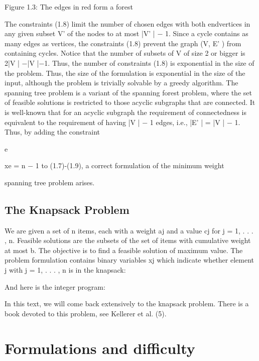 \documentclass[titlepage]{book}
\begin{document}

Figure 1.3: The edges in red form a forest


The constraints (1.8) limit the number of chosen edges with both endvertices in any given subset V' of
the nodes to at most |V' | − 1. Since a cycle contains as many edges as vertices, the constraints (1.8)
prevent the graph (V, E' ) from containing cycles.
Notice that the number of subsets of V of size 2 or bigger is 2|V | −|V |−1. Thus, the number of constraints
(1.8) is exponential in the size of the problem. Thus, the size of the formulation is exponential in the size
of the input, although the problem is trivially solvable by a greedy algorithm.
The spanning tree problem is a variant of the spanning forest problem, where the set of feasible solutions is
restricted to those acyclic subgraphs that are connected. It is well-known that for an acyclic subgraph the
requirement of connectedness is equivalent to the requirement of having |V | − 1 edges, i.e., |E' | = |V | − 1.
Thus, by adding the constraint

e

xe = n − 1 to (1.7)-(1.9), a correct formulation of the minimum weight

spanning tree problem arises.

\subsection{The Knapsack Problem}

We are given a set of n items, each with a weight aj and a value cj for j = 1, . . . , n. Feasible solutions
are the subsets of the set of items with cumulative weight at most b. The objective is to find a feasible
solution of maximum value. The problem formulation contains binary variables xj which indicate whether
element j with j = 1, . . . , n is in the knapsack:


And here is the integer program:


In this text, we will come back extensively to the knapsack problem. There is a book devoted to this
problem, see Kellerer et al. (5).

\section{Formulations and difficulty}
\end{document}

